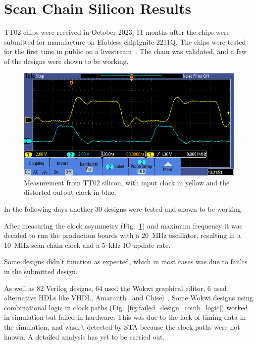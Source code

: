 \section{Scan Chain Silicon Results}
\label{sec:scan_chain_res}

TT02 chips were received in October 2023, 11 months after the chips were submitted for manufacture on Efabless chipIgnite 2211Q.
The chips were tested for the first time in public on a livestream~\cite{siliconalive}.
The chain was validated, and a few of the designs were shown to be working.

\begin{figure}[!t]
\centering
\includegraphics[width=\columnwidth]{./Figs/tt02_clock_out.png}
\caption{Measurement from TT02 silicon, with input clock in yellow and the distorted output clock in blue.}
\label{fig:TT02_clock_out}
\end{figure}

In the following days another 30 designs were tested and shown to be working.

After measuring the clock asymmetry (Fig.~\ref{fig:TT02_clock_out}) and maximum frequency it was decided to run the production boards with a \qty{20}{\MHz} oscillator, resulting in a \qty{10}{\MHz} scan chain clock and a \qty{5}{\kHz} IO update rate.

Some designs didn’t function as expected, which in most cases was due to faults in the submitted design.

As well as 82 Verilog designs, 64 used the Wokwi graphical editor, 6 used alternative HDLs like VHDL, Amaranth~\cite{amaranth} and Chisel~\cite{chisel}.
Some Wokwi designs using combinational logic in clock paths (Fig.~\ref{fig:failed_design_comb_logic}) worked in simulation but failed in hardware.
This was due to the lack of timing data in the simulation, and wasn’t detected by STA because the clock paths were not known. A detailed analysis has yet to be carried out.

